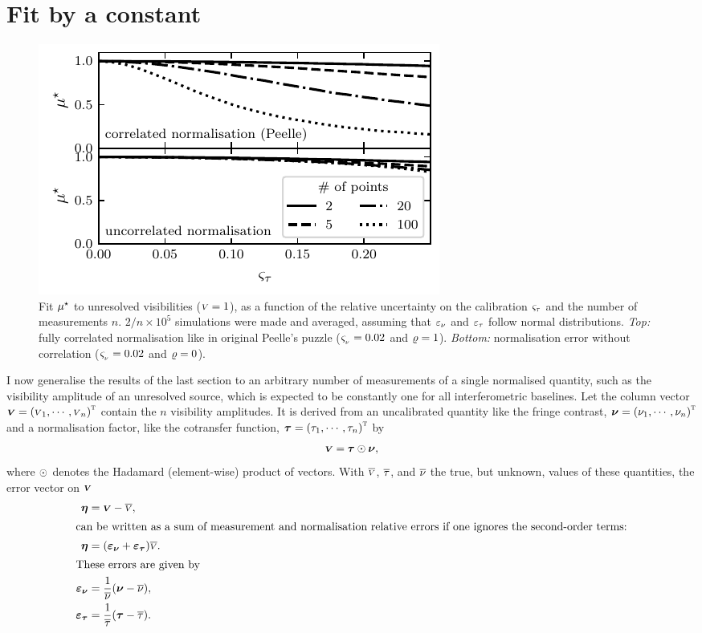\documentclass{pasa}
\begin{document}
\section{Fit by a constant}
\label{sec:single} 

\begin{figure}
\centering
\includegraphics[width=\linewidth]{pdf/uncorrelated-peelle.pdf}
\caption{Fit $\mu^\star$  to unresolved visibilities (${\scriptstyle V} = 1$), as a function of the relative uncertainty on the calibration $\varsigma_\tau$ and the number of measurements $n$. $2/n\times10^5$ simulations were made and averaged, assuming that $\varepsilon_\nu$ and $\varepsilon_\tau$ follow normal distributions. \textit{Top:} fully correlated normalisation like in original Peelle's puzzle ($\varsigma_{_\nu}=0.02$ and $\varrho = 1$). \textit{Bottom:} normalisation error without correlation ($\varsigma_{_\nu}=0.02$ and $\varrho = 0$).}
\label{fig:uncorr-peelle}
\end{figure}

I now generalise the results of the last section to an arbitrary number of measurements of a single normalised quantity, such as the visibility amplitude of an unresolved source, which is expected to be constantly one for all interferometric baselines. Let the column vector $\boldsymbol{{\scriptstyle V}} = {({\scriptstyle V}_1, \cdots, {\scriptstyle V}_n)}^\text{\textsc{t}}$ contain the $n$ visibility amplitudes. It is derived from an uncalibrated quantity like the fringe contrast, $\boldsymbol{\nu} = {(\nu_1, \cdots, \nu_n)}^\text{\textsc{t}}$ and a normalisation factor, like the cotransfer function, $\boldsymbol{\tau} = {(\tau_1, \cdots, \tau_n)}^\text{\textsc{t}}$ by 
\begin{equation}
    \boldsymbol{{\scriptstyle V}} = \boldsymbol{\tau}\odot\boldsymbol{\nu},
\end{equation}
where $\odot$ denotes the Hadamard (element-wise) product of vectors. With $\overline{{\scriptstyle V}}$, $\overline{\tau}$, and $\overline{\nu}$ the true, but unknown, values of these quantities, the error vector on $\boldsymbol{{\scriptstyle V}}$  
\begin{align}
    \boldsymbol{\eta}    &= \boldsymbol{{\scriptstyle V}} - \overline{{\scriptstyle V}}, \\
\intertext{can be written as a sum of measurement and normalisation relative errors if one ignores the second-order terms:}
    \boldsymbol{\eta}    &= (\boldsymbol{\varepsilon_\nu} + \boldsymbol{\varepsilon_\tau}) \overline{{\scriptstyle V}}.\\
\intertext{These errors are given by}
    \boldsymbol{\varepsilon_\nu} &= \frac1{\overline{\nu}} (\boldsymbol{\nu} - \overline{\nu}), \\
    \boldsymbol{\varepsilon_\tau} &= \frac1{\overline{\tau}} (\boldsymbol{\tau}-\overline{\tau}).
\end{align}
\end{document}
